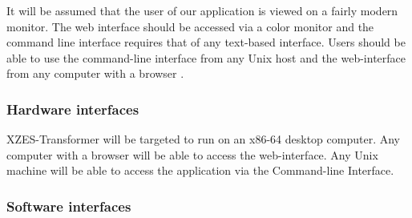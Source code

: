 It will be assumed that the user of our application is viewed on a fairly modern monitor.
The web interface should be accessed via a color monitor and the command line interface requires that of any text-based interface.
Users should be able to use the command-line interface from any Unix host and the web-interface from any computer with a browser .


\subsubsection{Hardware interfaces}

XZES-Transformer will be targeted to run on an x86-64 desktop computer.
Any computer with a browser will be able to access the web-interface.
Any Unix machine will be able to access the application via the Command-line Interface.


\subsubsection{Software interfaces}

